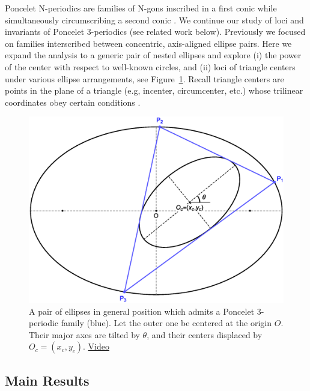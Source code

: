 Poncelet N-periodics are families of N-gons inscribed in a first conic while simultaneously circumscribing a second conic \cite{dragovic11}. We continue our study of loci and invariants of Poncelet 3-periodics (see related work below). Previously we focused on families interscribed between concentric, axis-aligned ellipse pairs. Here we expand the analysis to a generic pair of nested ellipses and explore (i) the power of the center with respect to well-known circles, and (ii) loci of triangle centers under various ellipse arrangements, see Figure~\ref{fig:n3-general-pos}. Recall triangle centers are points in the plane of a triangle (e.g, incenter, circumcenter, etc.) whose trilinear coordinates obey certain conditions \cite{kimberling1993_rocky}.

\begin{figure}
    \centering
    \includegraphics[width=.6\textwidth]{pics/0070_n3_nonconcentric.eps}
    \caption{A pair of ellipses in general position which admits a Poncelet 3-periodic family (blue). Let the outer one be centered at the origin $O$. Their major axes are tilted by $\theta$, and their centers displaced by $O_c=(x_c,y_c)$. \href{https://youtu.be/bjHpXVyXXVc}{Video}}
    \label{fig:n3-general-pos}
\end{figure}

\subsection*{Main Results}

